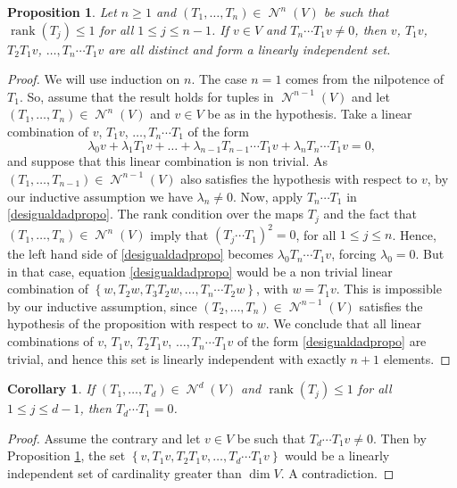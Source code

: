 \documentclass[11pt]{article}
\let\mathcal\mathscr
\theoremstyle{plain}
\newtheorem{prop}[teo]{Proposition}
\newtheorem{coro}[teo]{Corollary}
\theoremstyle{definition}
\newcommand{\corchete}[1]{\left\{{#1}\right\}}
\DeclareMathOperator{\Nil}{\mathcal{N}}
\DeclareMathOperator{\rank}{rank}
\begin{document}
\begin{prop}\label{proprango}
Let $n\geq 1$ and $(T_1,\dots,T_n)\in \Nil^{n}(V)$ be such that $\rank(T_j)\leq 1$ for all $1\leq j\leq n-1$. If $v\in V$ and $T_n\cdots T_{1}v\neq 0$, then $v$, $T_1{v}$, $T_{2}T_{1}v$, $\dots,T_{n}\cdots T_{1}v$ are all distinct and form a linearly independent set.
\end{prop}
\begin{proof} We will use induction on $n$. The case $n=1$ comes from the nilpotence of $T_1$. So, assume that the result holds for tuples in $\Nil^{n-1}(V)$ and let $(T_1,\dots,T_{n})\in \Nil^{n}(V)$ and $v\in V$ be as in the hypothesis.
Take a linear combination of $v$, $T_1{v}$, $\dots,T_{n}\cdots T_{1}$ of the form\vspace*{-3pt}\enlargethispage{\baselineskip}%
\begin{equation}\label{desigualdadpropo}
\lambda_{0}v+\lambda_{1}T_1{v}+\dots+\lambda_{n-1}T_{n-1}\cdots T_{1}v+\lambda_{n}T_{n}\cdots T_{1}v=0,
\end{equation}
and suppose that this linear combination is non trivial. As $(T_1,\dots,T_{n-1})\in \Nil^{n-1}(V)$ also satisfies the hypothesis with respect to $v$, by our inductive assumption we have $\lambda_{n}\neq 0$.
Now, apply $T_{n}\cdots T_{1}$ in \eqref{desigualdadpropo}. The rank condition over the maps $T_{j}$ and the fact that $(T_1,\dots,T_n)\in \Nil^{n}(V)$ imply that $(T_{j}\cdots T_{1})^{2}=0$, for all $1\leq j \leq n$. Hence, the left hand side of \eqref{desigualdadpropo} becomes $\lambda_{0}T_{n}\cdots T_{1}v$, forcing $\lambda_{0}=0$. But in that case, equation \eqref{desigualdadpropo} would be a non trivial linear combination of $\corchete{w,T_{2}{w},T_{3}T_{2}w,\dots,T_{n}\cdots T_{2}w}$, with $w=T_{1}v$. This is impossible by our inductive assumption, since $(T_{2},\dots,T_{n})\in \Nil^{n-1}(V)$ satisfies the hypothesis of the proposition with respect to $w$. We conclude that all linear combinations of $v$, $T_1{v}$, $T_{2}T_{1}v$, $\dots,T_{n}\cdots T_{1}v$ of the form \eqref{desigualdadpropo} are trivial, and hence this set is linearly independent with exactly $n+1$ elements.
\end{proof}

\begin{coro}\label{cororango}
If $(T_1,\dots,T_d)\in \Nil^{d}(V)$ and $\rank(T_j)\leq 1$ for all $1 \leq j\leq d-1$, then $T_d\cdots T_1=0$.
\end{coro}
\begin{proof}
Assume the contrary and let $v\in V$ be such that $T_{d}\cdots T_{1}v\neq 0$. Then by Proposition \ref{proprango}, the set $\corchete{v,T_1{v},T_{2}T_{1}v,\dots,T_{d}\cdots T_{1}v}$ would be a linearly independent set of cardinality greater than $\dim{V}$. A contradiction.
\end{proof}
\end{document}
